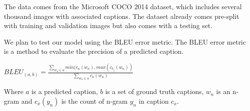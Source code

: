 \documentclass[11pt, oneside]{article}   	%
\begin{document}
The data comes from the Microsoft COCO 2014 dataset, which includes several thousand images with associated captions. The dataset already comes pre-split with training and validation images but also comes with a testing set.

We plan to test our model using the BLEU error metric. The BLEU error metric is a method to evaluate the precision of a predicted caption.

\begin{center}
	$BLEU_{(a,b)} = \frac{\sum_{w_n \in a} min(c_a(w_n),max(c_{b_j}(w_n))}{\sum_{w_n \in a} c_a(w_n)}$
\end{center}

Where $a$ is a predicted caption, $b$ is a set of ground truth captions, $w_n$ is an n-gram and $c_x(y_n)$ is the count of n-gram $y_n$ in caption $c_x$.
\vspace{5mm}
\end{document}
